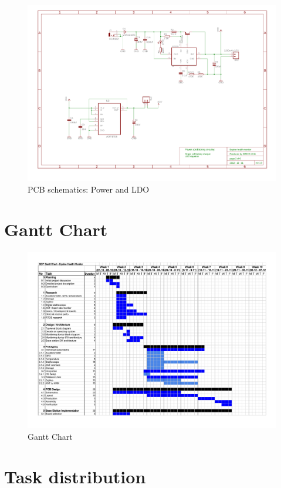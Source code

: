 \begin{figure}[htb]
\centering
\includegraphics[width=\columnwidth]{Images/pcb_power_ldo}
\caption{PCB schematics: Power and LDO}
\label{fig:pcb_schematics_6}
\end{figure}




\clearpage
\section{Gantt Chart}
\label{sec:gantt_chart}
\begin{figure}[htb]
\centering
\includegraphics[angle=90, width=0.9\columnwidth]{Data/gantt_chart}
\caption{Gantt Chart}
\label{fig:gantt_chart}
\end{figure}

\clearpage

\section{Task distribution}
\label{sec:task_distribution}
\TODO{}


